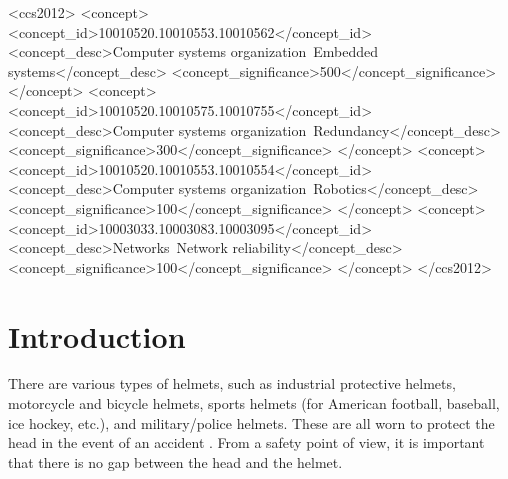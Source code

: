 \documentclass[sigchi,authordraft]{acmart}
\begin{document}
\begin{CCSXML}
<ccs2012>
 <concept>
  <concept_id>10010520.10010553.10010562</concept_id>
  <concept_desc>Computer systems organization~Embedded systems</concept_desc>
  <concept_significance>500</concept_significance>
 </concept>
 <concept>
  <concept_id>10010520.10010575.10010755</concept_id>
  <concept_desc>Computer systems organization~Redundancy</concept_desc>
  <concept_significance>300</concept_significance>
 </concept>
 <concept>
  <concept_id>10010520.10010553.10010554</concept_id>
  <concept_desc>Computer systems organization~Robotics</concept_desc>
  <concept_significance>100</concept_significance>
 </concept>
 <concept>
  <concept_id>10003033.10003083.10003095</concept_id>
  <concept_desc>Networks~Network reliability</concept_desc>
  <concept_significance>100</concept_significance>
 </concept>
</ccs2012>
\end{CCSXML}




\maketitle

\section{Introduction}
\label{sec:introduction}
There are various types of helmets, such as industrial protective helmets, motorcycle and bicycle helmets, sports helmets (for American football, baseball, ice hockey, etc.), and military/police helmets. These are all worn to protect the head in the event of an accident \cite{helmet}. From a safety point of view, it is important that there is no gap between the head and the helmet.\par
\end{document}
